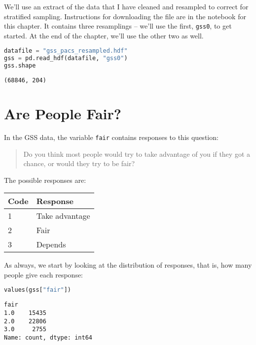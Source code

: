 We'll use an extract of the data that I have cleaned and resampled to
correct for stratified sampling. Instructions for downloading the file
are in the notebook for this chapter. It contains three resamplings --
we'll use the first, \passthrough{\lstinline!gss0!}, to get started. At
the end of the chapter, we'll use the other two as well.

\begin{lstlisting}[language=Python,style=source]
datafile = "gss_pacs_resampled.hdf"
gss = pd.read_hdf(datafile, "gss0")
gss.shape
\end{lstlisting}

\begin{lstlisting}[style=output]
(68846, 204)
\end{lstlisting}

\hypertarget{are-people-fair}{%
\section{Are People Fair?}\label{are-people-fair}}

In the GSS data, the variable \passthrough{\lstinline!fair!} contains
responses to this question:

\begin{quote}
Do you think most people would try to take advantage of you if they got
a chance, or would they try to be fair?
\end{quote}

The possible responses are:

\begin{longtable}[]{@{}ll@{}}
\midrule()
Code & Response \\
\midrule()
\endhead
1 & Take advantage \\
2 & Fair \\
3 & Depends \\
\midrule()
\end{longtable}

As always, we start by looking at the distribution of responses, that
is, how many people give each response:

\begin{lstlisting}[language=Python,style=source]
values(gss["fair"])
\end{lstlisting}

\begin{lstlisting}[style=output]
fair
1.0    15435
2.0    22806
3.0     2755
Name: count, dtype: int64
\end{lstlisting}

